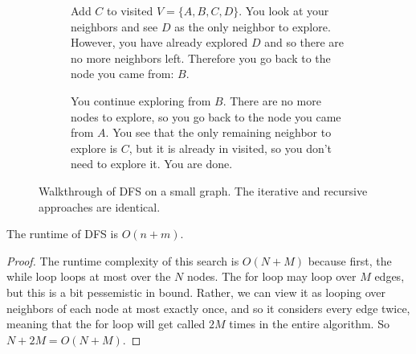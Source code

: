 \begin{example}
\begin{figure}[H]
\begin{subfigure}[b]{0.48\textwidth}
        \caption{Add $C$ to visited $V = \{A, B, C, D\}$. You look at your neighbors and see $D$ as the only neighbor to explore. However, you have already explored $D$ and so there are no more neighbors left. Therefore you go back to the node you came from: $B$.}
      \end{subfigure}
      \hfill 
      \begin{subfigure}[b]{0.48\textwidth}
        \centering
        \caption{You continue exploring from $B$. There are no more nodes to explore, so you go back to the node you came from $A$. You see that the only remaining neighbor to explore is $C$, but it is already in visited, so you don't need to explore it. You are done.}
      \end{subfigure}

      \caption{Walkthrough of DFS on a small graph. The iterative and recursive approaches are identical.}
      \label{fig:dfs_example}
    \end{figure}
  \end{example}

  \begin{theorem}
    \label{thm:runtime-of-dfs}
    The runtime of DFS is $O(n+m)$. 
  \end{theorem}
  \begin{proof}
    The runtime complexity of this search is $O(N + M)$ because first, the while loop loops at most over the $N$ nodes. The for loop may loop over $M$ edges, but this is a bit pessemistic in bound. Rather, we can view it as looping over neighbors of each node at most exactly once, and so it considers every edge twice, meaning that the for loop will get called $2M$ times in the entire algorithm. So $N + 2M = O(N + M)$. 
  \end{proof}

